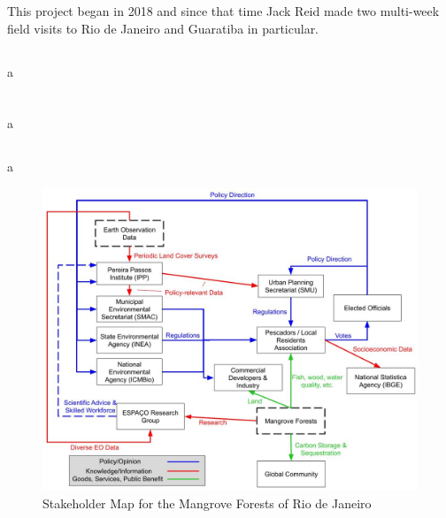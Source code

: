 This project began in 2018 and since that time Jack Reid made two multi-week field visits to Rio de Janeiro and Guaratiba in particular.

\subsection{}

a

\section{}

a

\subsection{}

a

\begin{figure}[h]
	\centering
	\includegraphics[scale=0.3]{Figures/chap4/Stakeholder_Map_v2.jpg}
	\caption[Stakeholder Map for the Mangrove Forests of Rio de Janeiro]{Stakeholder Map for the Mangrove Forests of Rio de Janeiro}
	\label{fig:rio_stakemap}
\end{figure}

\subsection{}

